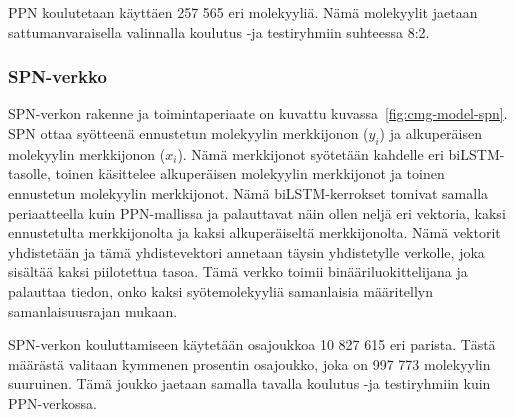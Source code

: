 \documentclass[finnish,twoside,censored,tkt,sw-line]{HYthesisML}
\begin{document}
PPN koulutetaan käyttäen 257 565 eri molekyyliä.
Nämä molekyylit jaetaan sattumanvaraisella valinnalla koulutus -ja testiryhmiin suhteessa 8:2.

\subsubsection{SPN-verkko}

SPN-verkon rakenne ja toimintaperiaate on kuvattu kuvassa~\ref{fig:cmg-model-spn}.
SPN ottaa syötteenä ennustetun molekyylin merkkijonon (\(y_i\)) ja alkuperäisen molekyylin merkkijonon (\(x_i\)).
Nämä merkkijonot syötetään kahdelle eri biLSTM-tasolle, toinen käsittelee alkuperäisen molekyylin merkkijonot ja toinen ennustetun molekyylin merkkijonot.
Nämä biLSTM-kerrokset tomivat samalla periaatteella kuin PPN-mallissa ja palauttavat näin ollen neljä eri vektoria, kaksi ennustetulta merkkijonolta ja kaksi alkuperäiseltä merkkijonolta.
Nämä vektorit yhdistetään ja tämä yhdistevektori annetaan täysin yhdistetylle verkolle, joka sisältää kaksi piilotettua tasoa.
Tämä verkko toimii binääriluokittelijana ja palauttaa tiedon, onko kaksi syötemolekyyliä samanlaisia määritellyn samanlaisuusrajan mukaan.

SPN-verkon kouluttamiseen käytetään osajoukkoa 10 827 615 eri parista.
Tästä määrästä valitaan kymmenen prosentin osajoukko, joka on 997 773 molekyylin suuruinen.
Tämä joukko jaetaan samalla tavalla koulutus -ja testiryhmiin kuin PPN-verkossa.
\end{document}

